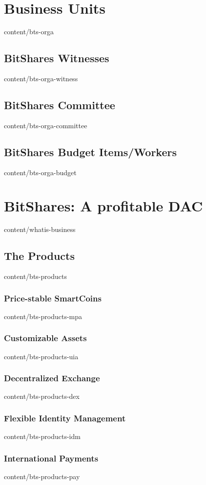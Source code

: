 \documentclass{btswhitepaper}
\begin{document}
\section       { Business Units                    }  { content/bts-orga            }
\subsection    { BitShares Witnesses               }  { content/bts-orga-witness    }
\subsection    { BitShares Committee               }  { content/bts-orga-committee  }
\subsection    { BitShares Budget Items/Workers    }  { content/bts-orga-budget     }

\section       { BitShares: A profitable DAC       }  { content/whatis-business     } 
\subsection    { The Products                      }  { content/bts-products        }
\subsubsection { Price-stable SmartCoins           }  { content/bts-products-mpa    }
\subsubsection { Customizable Assets               }  { content/bts-products-uia    }
\subsubsection { Decentralized Exchange            }  { content/bts-products-dex    }
\subsubsection { Flexible Identity Management      }  { content/bts-products-idm    }
\subsubsection { International Payments            }  { content/bts-products-pay    }
\end{document}
